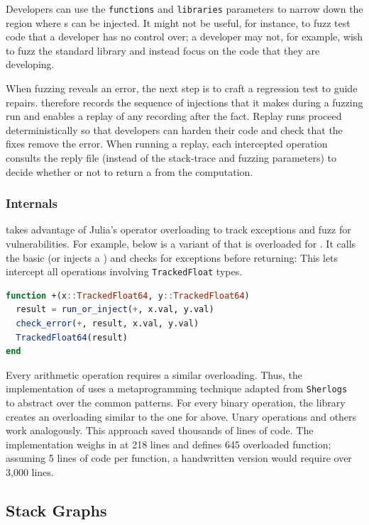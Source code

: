 \documentclass{juliacon}
\begin{document}
Developers can use the \texttt{functions} and \texttt{libraries}
parameters to narrow down the region where \Nan{}s can be injected.
It might not be useful, for instance, to fuzz test code that a
developer has no control over; a developer may not, for example, wish
to fuzz the standard library and instead focus on the code that they
are developing.

When fuzzing reveals an error, the next step is to craft a regression test to
guide repairs.
\FT{} therefore records the sequence of injections that it makes during a fuzzing
run and enables a replay of any recording after the fact.
Replay runs proceed deterministically so that developers can harden
their code and check that the fixes remove the error.
When running a replay, each intercepted operation consults the reply
file (instead of the stack-trace and fuzzing parameters) to decide
whether or not to return a \Nan{} from the computation.


\subsubsection{\FT{} Internals}

\FT{} takes advantage of Julia's operator overloading to track exceptions and
fuzz for vulnerabilities.
For example, below is a variant of \code{+} that is overloaded
for .
It calls the basic \code{+} (or injects a \Nan{}) and checks for exceptions
before returning:
This lets \FT{} intercept all \fp{} operations involving \texttt{TrackedFloat} types.

\begin{lstlisting}[language = Julia]
function +(x::TrackedFloat64, y::TrackedFloat64)
  result = run_or_inject(+, x.val, y.val)
  check_error(+, result, x.val, y.val)
  TrackedFloat64(result)
end
\end{lstlisting}

Every arithmetic operation requires a similar overloading.
Thus, the implementation of \FT{} uses a metaprogramming technique
adapted from \texttt{Sherlogs}~\cite{kMilanklSherlogsJl2021}
to abstract over the common patterns.
For every binary operation, the library creates an overloading similar
to the one for \code{+} above.
Unary operations and others work analogously.
This approach saved thousands of lines of code.
The implementation weighs in at 218 lines and defines 645 overloaded function;
assuming 5 lines of code per function, a handwritten version would require over 3,000 lines.


\subsection{Stack Graphs}
\label{s:cstg}
\end{document}
